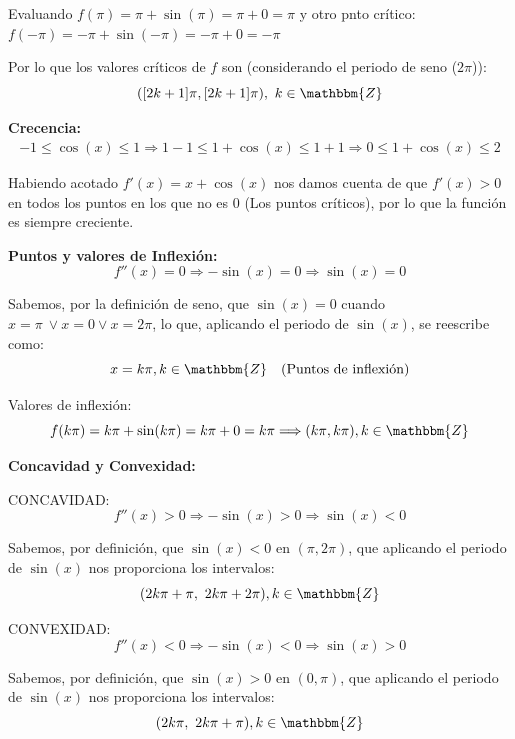 \documentclass[12pt]{article}
\begin{document}
\begin{enumerate}[\hspace{9px} a)]
        Evaluando \(f(\pi)=\pi+\sin(\pi)=\pi+0=\pi\) y otro pnto cr\'itico: \(f(-\pi)=-\pi+\sin(-\pi)=-\pi+0=-\pi\)\medskip

        Por lo que los valores cr\'iticos de \(f\) son (considerando el periodo de seno (\(2\pi\))):
        \[([2k+1]\pi,[2k+1]\pi), \ k\in\mathbbm{Z}\]

    \textbf{Crecencia: }
        \begin{align*}
            -1\leq\cos(x)\leq1 \Longrightarrow 1-1\leq1+\cos(x)\leq1+1 \Longrightarrow 0\leq1+\cos(x)\leq2 
        \end{align*}

        Habiendo acotado \(f'(x)=x+\cos(x)\) nos damos cuenta de que \(f'(x)>0\) en todos los puntos en los que no es 0 (Los puntos cr\'iticos), por lo que la funci\'on es siempre creciente.\medskip

    \textbf{Puntos y valores de Inflexi\'on: }
        \begin{equation*}
            f''(x)=0 \Longrightarrow -\sin(x)=0 \Longrightarrow \sin(x)=0 
        \end{equation*}

        Sabemos, por la definici\'on de seno, que \(\sin(x)=0\) cuando \(x=\pi \ \vee x=0 \vee x=2\pi\), lo que, aplicando el periodo de \(\sin(x)\), se reescribe como:
        \[x=k\pi, k\in\mathbbm{Z} \quad \text{(Puntos de inflexión)}\]

        Valores de inflexi\'on:
        \[f(k\pi)=k\pi+\sin(k\pi)=k\pi+0=k\pi \Longrightarrow (k\pi,k\pi), k\in\mathbbm{Z}\]

    \textbf{Concavidad y Convexidad: }\medskip

        CONCAVIDAD:
        \begin{equation*}
            f''(x)>0 \Longrightarrow -\sin(x)>0 \Longrightarrow \sin(x)<0
        \end{equation*}

        Sabemos, por definici\'on, que \(\sin(x)<0\) en \((\pi,2\pi)\), que aplicando el periodo de \(\sin(x)\) nos proporciona los intervalos:
        \[(2k\pi+\pi, \ 2k\pi+2\pi), k\in\mathbbm{Z}\]

        CONVEXIDAD:
        \begin{equation*}
            f''(x)<0 \Longrightarrow -\sin(x)<0 \Longrightarrow \sin(x)>0
        \end{equation*}

        Sabemos, por definici\'on, que \(\sin(x)>0\) en \((0,\pi)\), que aplicando el periodo de \(\sin(x)\) nos proporciona los intervalos:
        \[(2k\pi, \ 2k\pi+\pi), k\in\mathbbm{Z}\]


\end{enumerate}
\end{document}
